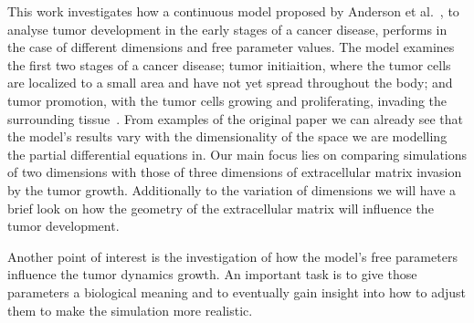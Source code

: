 This work investigates how a continuous model proposed by Anderson et al.~\cite{anderson_continuous_1998,anderson_mathematical_2000}, to analyse tumor development in the early stages of a cancer disease, performs in the case of different dimensions and free parameter values. The model examines the first two stages of a cancer disease; tumor initiaition, where the tumor cells are localized to a small area and have not yet spread throughout the body; and tumor promotion, with the tumor cells growing and proliferating, invading the surrounding tissue~\cite{10.1158/2159-8290.CD-21-1059}. From examples of the original paper we can already see that the model's results vary with the dimensionality of the space we are modelling the partial differential equations in. Our main focus lies on comparing simulations of two dimensions with those of three dimensions of extracellular matrix invasion by the tumor growth. Additionally to the variation of dimensions we will have a brief look on how the geometry of the extracellular matrix will influence the tumor development.

Another point of interest is the investigation of how the model's free parameters influence the tumor dynamics growth. An important task is to give those parameters a biological meaning and to eventually gain insight into how to adjust them to make the simulation more realistic.